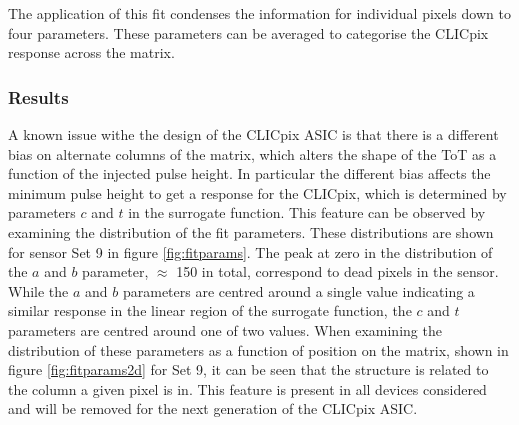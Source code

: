 The application of this fit condenses the information for individual pixels down to four parameters.  These parameters can be averaged to categorise the CLICpix response across the matrix.  


\subsubsection{Results}
\label{sec:testpulsecalibrationresults}
A known issue withe the design of the CLICpix ASIC is that there is a different bias on alternate columns of the matrix, which alters the shape of the ToT as a function of the injected pulse height.  In particular the different bias affects the minimum pulse height to get a response for the CLICpix, which is determined by parameters $c$ and $t$ in the surrogate function.  This feature can be observed by examining the distribution of the fit parameters.  These distributions are shown for sensor Set 9 in figure \ref{fig:fitparams}.  The peak at zero in the distribution of the $a$ and $b$ parameter, $\approx$ 150 in total, correspond to dead pixels in the sensor.  While the $a$ and $b$ parameters are centred around a single value indicating a similar response in the linear region of the surrogate function, the $c$ and $t$ parameters are centred around one of two values.  When examining the distribution of these parameters as a function of position on the matrix, shown in figure \ref{fig:fitparams2d} for Set 9, it can be seen that the structure is related to the column a given pixel is in.  This feature is present in all devices considered and will be removed for the next generation of the CLICpix ASIC.

